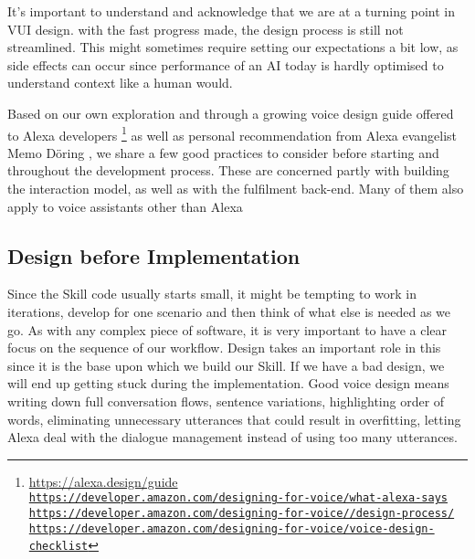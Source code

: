 
It's important to understand and acknowledge that we are at a turning point %
in VUI design.%
with the fast progress made, the design process is still %
not streamlined. %
This might sometimes require setting our expectations a bit low, as side effects can occur since%
performance of an AI today is hardly optimised to understand context like a human would. %
  
Based on our own exploration and through a growing voice design guide offered to Alexa developers \footnote{\url{https://alexa.design/guide} \\ \href{https://developer.amazon.com/designing-for-voice/what-alexa-says/}{\lstinline|https://developer.amazon.com/designing-for-voice/what-alexa-says|}\\
	\href{https://developer.amazon.com/designing-for-voice/design-process/}{\lstinline|https://developer.amazon.com/designing-for-voice//design-process/|}\\
	\href{https://developer.amazon.com/designing-for-voice/voice-design-checklist}{\lstinline|https://developer.amazon.com/designing-for-voice/voice-design-checklist|}
} as well as personal recommendation from Alexa evangelist Memo Döring \cite{memo:devDay}, we share a few good practices to consider before starting and throughout the development process. These are concerned partly with building the interaction model, as well as with the fulfilment back-end. Many of them also apply to voice assistants other than Alexa






\subsection*{Design before Implementation}
Since the Skill code usually starts small, it might be tempting to work in iterations, develop for one scenario and then think of what else is needed as we go.
As with any complex piece of software, it is very important to have a clear focus on the sequence of our workflow. Design takes an important role in this since it is the base upon which we build our Skill. If we have a bad design, we will end up getting stuck during the implementation. Good voice design means writing down full conversation flows, sentence variations, highlighting order of words, eliminating unnecessary utterances that could result in overfitting, letting Alexa deal with the dialogue management instead of using too many utterances.

